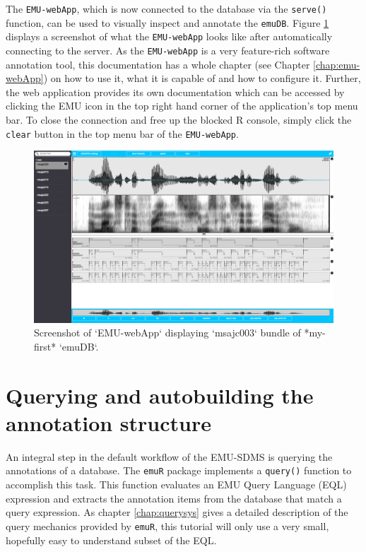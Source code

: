 \documentclass[]{book}
\begin{document}
The \texttt{EMU-webApp}, which is now connected to the database via the \texttt{serve()} function, can be used to visually inspect and annotate the \texttt{emuDB}. Figure \ref{fig:tutorial-emuWebAppMyFirst} displays a screenshot of what the \texttt{EMU-webApp} looks like after automatically connecting to the server. As the \texttt{EMU-webApp} is a very feature-rich software annotation tool, this documentation has a whole chapter (see Chapter \ref{chap:emu-webApp}) on how to use it, what it is capable of and how to configure it. Further, the web application provides its own documentation which can be accessed by clicking the EMU icon in the top right hand corner of the application's top menu bar. To close the connection and free up the blocked R console, simply click the \texttt{clear} button in the top menu bar of the \texttt{EMU-webApp}.

\begin{figure}

{\centering \includegraphics[width=1\linewidth]{pics/tutorialEmuWebAppMyFirst} 

}

\caption{Screenshot of `EMU-webApp` displaying `msajc003` bundle of *my-first* `emuDB`.}\label{fig:tutorial-emuWebAppMyFirst}
\end{figure}

\hypertarget{querying-and-autobuilding-the-annotation-structure}{%
\section{Querying and autobuilding the annotation structure}\label{querying-and-autobuilding-the-annotation-structure}}

An integral step in the default workflow of the EMU-SDMS is querying the annotations of a database. The \texttt{emuR} package implements a \texttt{query()} function to accomplish this task. This function evaluates an EMU Query Language (EQL) expression and extracts the annotation items from the database that match a query expression. As chapter \ref{chap:querysys} gives a detailed description of the query mechanics provided by \texttt{emuR}, this tutorial will only use a very small, hopefully easy to understand subset of the EQL.
\end{document}
